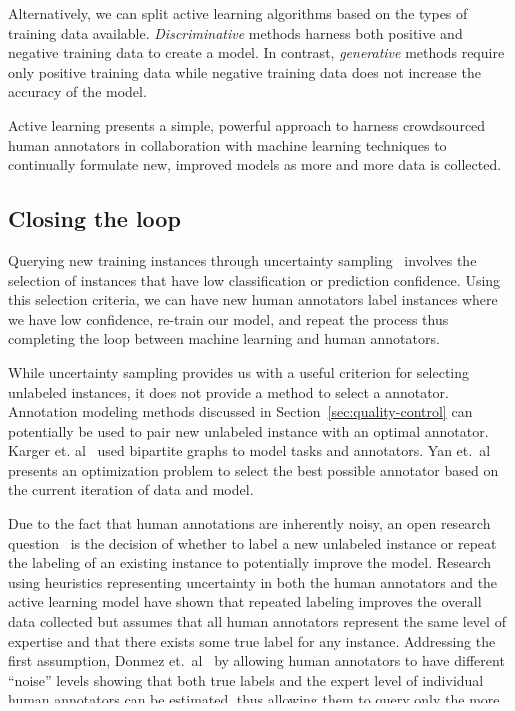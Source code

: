\documentclass[10pt,twocolumn]{article}
\begin{document}
Alternatively, we can split active learning algorithms based on
the types of training data available. \textit{Discriminative} methods 
harness both positive and negative training data to create a model. 
In contrast, \textit{generative} methods require only positive training 
data while negative training data does not increase the accuracy of the model.

Active learning presents a simple, powerful approach to harness crowdsourced
human annotators in collaboration with machine learning techniques to 
continually formulate new, improved models as more and more data is collected.


\subsection{Closing the loop}
Querying new training instances through uncertainty sampling~\cite{Lewis1994}
involves the selection of instances that have low classification or prediction
confidence. Using this selection criteria, we can have new human annotators 
label instances where we have low confidence, re-train our model, and repeat
the process thus completing the loop between machine learning and human
annotators.

While uncertainty sampling provides us with a useful criterion for selecting
unlabeled instances, it does not provide a method to select a annotator. 
Annotation modeling methods discussed in Section~\ref{sec:quality-control} can
potentially be used to pair new unlabeled instance with an optimal annotator.
Karger et. al~\cite{Karger} used bipartite graphs to model tasks and annotators.
Yan et.\ al~\cite{Yan2011} presents an optimization problem to select the best possible annotator based on the current iteration of data and model.

Due to the fact that human annotations are inherently noisy, an open research
question~\cite{Settles2010} is the decision of whether to label a new 
unlabeled instance or repeat the labeling of an existing instance to 
potentially improve the model. Research~\cite{Sheng2008} using heuristics
representing uncertainty in both the human annotators and the active learning 
model have shown that repeated labeling improves the overall data collected but
assumes that all human annotators represent the same level of expertise and
that there exists some true label for any instance. Addressing the first 
assumption, Donmez et.\ al~\cite{Donmez2009} by allowing human annotators to
have different ``noise'' levels showing that both true labels and the 
expert level of individual human annotators can be estimated, thus allowing
them to query only the more expert human annotators in later active learning
iterations.
\end{document}
